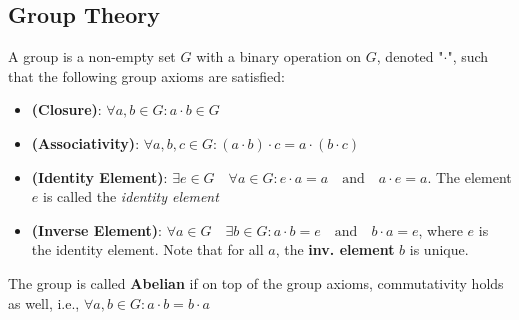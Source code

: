 \subsection{Group Theory}
A group is a non-empty set $G$ with a binary operation on $G$, denoted "$\cdot$", such that the following group axioms are satisfied: 
\begin{itemize}
    \item \textbf{(Closure)}: $\forall a, b \in G: a \cdot b \in G$
    \item \textbf{(Associativity)}: $\forall a, b, c\in G: (a \cdot b) \cdot c = a \cdot (b \cdot c)$
    \item \textbf{(Identity Element)}: $\exists e \in G \quad \forall a \in G : e \cdot a = a\quad \text{and} \quad a \cdot e =a$. The element $e$ is called the \emph{identity element}
    \item \textbf{(Inverse Element)}: $\forall a \in G \quad \exists b \in G: a \cdot b = e \quad \text{and} \quad b \cdot a = e$, where $e$ is the identity element. Note that for all $a$, the \textbf{inv. element} $b$ is unique.
\end{itemize}
The group is called \textbf{Abelian} if on top of the group axioms, commutativity holds as well, i.e., $\forall a,b \in G: a\cdot b = b \cdot a$